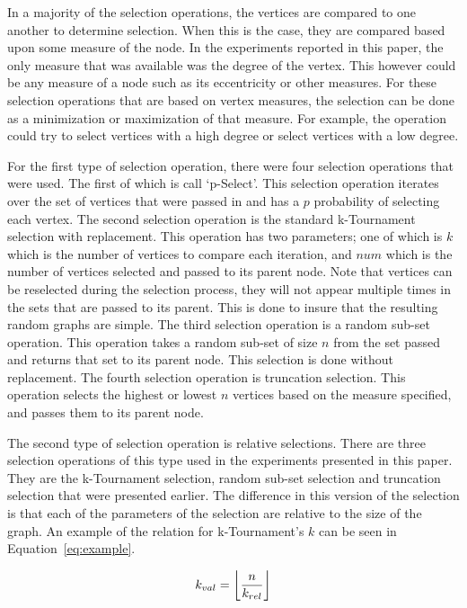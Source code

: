 \documentclass{article}
\DeclarePairedDelimiter\floor{\lfloor}{\rfloor}
\begin{document}
In a majority of the selection operations, the vertices are compared to one another to determine selection. When this is the case, 
they are compared based upon some measure of the node. In the experiments reported in this paper, the only measure that was available
was the degree of the vertex. This however could be any measure of a node such as its eccentricity or other measures. For these
selection operations that are based on vertex measures, the selection can be done as a minimization or maximization of that measure. For
example, the operation could try to select vertices with a high degree or select vertices with a low degree.

For the first type of selection operation, there were four selection operations that were used. The first of which is call `p-Select'.
This selection operation iterates over the set of vertices that were passed in and has a $p$ probability of selecting each vertex. The
second selection operation is the standard k-Tournament selection with replacement. This operation has two parameters; one of which is $k$ which
is the number of vertices to compare each iteration, and $num$ which is the number of vertices selected and passed to its parent node. Note that 
vertices can be reselected during the selection process, they will not appear multiple times in the sets that are passed to its parent. This 
is done to insure that the resulting random graphs are simple. The third selection operation is a random sub-set operation. This operation takes 
a random sub-set of size $n$ from the set passed and returns that set to its parent node. This selection is done without replacement. The fourth 
selection operation is truncation selection. This operation selects the highest or lowest $n$ vertices based on the measure specified, and passes
them to its parent node.

The second type of selection operation is relative selections. There are three selection operations of this type used in the experiments presented
in this paper. They are the k-Tournament selection, random sub-set selection and truncation selection that were presented earlier. The difference
in this version of the selection is that each of the parameters of the selection are relative to the size of the graph. An example of the
relation for k-Tournament's $k$ can be seen in Equation~\ref{eq:example}.

\begin{equation}
\label{eq:example}
k_{val} = \floor*{\frac{n}{k_{rel}}}
\end{equation}
\end{document}

